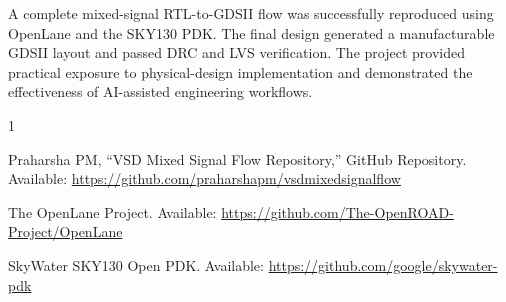 \documentclass[conference]{IEEEtran}
\begin{document}
A complete mixed-signal RTL-to-GDSII flow was successfully reproduced using OpenLane and the SKY130 PDK. The final design generated a manufacturable GDSII layout and passed DRC and LVS verification. The project provided practical exposure to physical-design implementation and demonstrated the effectiveness of AI-assisted engineering workflows.

\begin{thebibliography}{1}

Praharsha PM,
``VSD Mixed Signal Flow Repository,''
GitHub Repository.
Available:
\url{https://github.com/praharshapm/vsdmixedsignalflow}

The OpenLane Project.
Available:
\url{https://github.com/The-OpenROAD-Project/OpenLane}

SkyWater SKY130 Open PDK.
Available:
\url{https://github.com/google/skywater-pdk}

\end{thebibliography}
\end{document}
